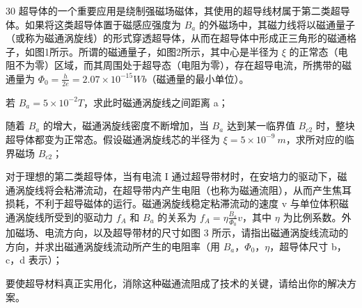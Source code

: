 \begin{problem}[理论考试][超导体与磁通涡旋线]{30}
  超导体的一个重要应用是绕制强磁场磁体，其使用的超导线材属于第二类超导体。如果将这类超导体置于磁感应强度为 $B_{a}$ 的外磁场中，其磁力线将以磁通量子（或称为磁通涡旋线）的形式穿透超导体，从而在超导体中形成正三角形的磁通格子，如图1所示。所谓的磁通量子，如图2所示，其中心是半径为 $\xi$ 的正常态（电阻不为零）区域，而其周围处于超导态（电阻为零），存在超导电流，所携带的磁通量为 $\Phi_{0}=\frac{h}{2e}=2.07\times10^{-15}Wb$（磁通量的最小单位）。

  \begin{subproblem}
    若 $B_{a}=5\times10^{-2}T$，求此时磁通涡旋线之间距离 a；
  \end{subproblem}
  \begin{subproblem}
    随着 $B_{a}$ 的增大，磁通涡旋线密度不断增加，当 $B_{a}$ 达到某一临界值 $B_{c2}$ 时，整块超导体都变为正常态。假设磁通涡旋线芯的半径为 $\xi = 5 \times 10^{-9} ~m$，求所对应的临界磁场 $B_{c2}$；
  \end{subproblem}
  \begin{subproblem}
    对于理想的第二类超导体，当有电流 I 通过超导带材时，在安培力的驱动下，磁通涡旋线将会粘滞流动，在超导带内产生电阻（也称为磁通流阻），从而产生焦耳损耗，不利于超导磁体的运行。磁通涡旋线稳定粘滞流动的速度 v 与单位体积磁通涡旋线所受到的驱动力 $f_{A}$ 和 $B_{a}$ 的关系为 $f_{A} = \eta \frac{B_{a}}{\Phi_{0}} v$，其中 $\eta$ 为比例系数。外加磁场、电流方向，以及超导带材的尺寸如图 3 所示，请指出磁通涡旋线流动的方向，并求出磁通涡旋线流动所产生的电阻率（用 $B_{a}$，$\Phi_{0}$，$\eta$，超导体尺寸 b，c，d 表示）；
  \end{subproblem}
  \begin{subproblem}
    要使超导材料真正实用化，消除这种磁通流阻成了技术的关键，请给出你的解决方案。
  \end{subproblem}
\end{problem}